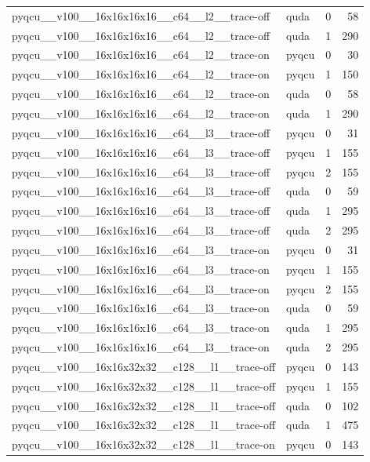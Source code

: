\begin{table}[htbp]
\begin{tabular}{@{}llrr@{}}
pyqcu\_\_v100\_\_16x16x16x16\_\_c64\_\_l2\_\_trace-off & quda & 0 & 58 \\
pyqcu\_\_v100\_\_16x16x16x16\_\_c64\_\_l2\_\_trace-off & quda & 1 & 290 \\
pyqcu\_\_v100\_\_16x16x16x16\_\_c64\_\_l2\_\_trace-on & pyqcu & 0 & 30 \\
pyqcu\_\_v100\_\_16x16x16x16\_\_c64\_\_l2\_\_trace-on & pyqcu & 1 & 150 \\
pyqcu\_\_v100\_\_16x16x16x16\_\_c64\_\_l2\_\_trace-on & quda & 0 & 58 \\
pyqcu\_\_v100\_\_16x16x16x16\_\_c64\_\_l2\_\_trace-on & quda & 1 & 290 \\
pyqcu\_\_v100\_\_16x16x16x16\_\_c64\_\_l3\_\_trace-off & pyqcu & 0 & 31 \\
pyqcu\_\_v100\_\_16x16x16x16\_\_c64\_\_l3\_\_trace-off & pyqcu & 1 & 155 \\
pyqcu\_\_v100\_\_16x16x16x16\_\_c64\_\_l3\_\_trace-off & pyqcu & 2 & 155 \\
pyqcu\_\_v100\_\_16x16x16x16\_\_c64\_\_l3\_\_trace-off & quda & 0 & 59 \\
pyqcu\_\_v100\_\_16x16x16x16\_\_c64\_\_l3\_\_trace-off & quda & 1 & 295 \\
pyqcu\_\_v100\_\_16x16x16x16\_\_c64\_\_l3\_\_trace-off & quda & 2 & 295 \\
pyqcu\_\_v100\_\_16x16x16x16\_\_c64\_\_l3\_\_trace-on & pyqcu & 0 & 31 \\
pyqcu\_\_v100\_\_16x16x16x16\_\_c64\_\_l3\_\_trace-on & pyqcu & 1 & 155 \\
pyqcu\_\_v100\_\_16x16x16x16\_\_c64\_\_l3\_\_trace-on & pyqcu & 2 & 155 \\
pyqcu\_\_v100\_\_16x16x16x16\_\_c64\_\_l3\_\_trace-on & quda & 0 & 59 \\
pyqcu\_\_v100\_\_16x16x16x16\_\_c64\_\_l3\_\_trace-on & quda & 1 & 295 \\
pyqcu\_\_v100\_\_16x16x16x16\_\_c64\_\_l3\_\_trace-on & quda & 2 & 295 \\
pyqcu\_\_v100\_\_16x16x32x32\_\_c128\_\_l1\_\_trace-off & pyqcu & 0 & 143 \\
pyqcu\_\_v100\_\_16x16x32x32\_\_c128\_\_l1\_\_trace-off & pyqcu & 1 & 155 \\
pyqcu\_\_v100\_\_16x16x32x32\_\_c128\_\_l1\_\_trace-off & quda & 0 & 102 \\
pyqcu\_\_v100\_\_16x16x32x32\_\_c128\_\_l1\_\_trace-off & quda & 1 & 475 \\
pyqcu\_\_v100\_\_16x16x32x32\_\_c128\_\_l1\_\_trace-on & pyqcu & 0 & 143 \\

\end{tabular}
\end{table}
